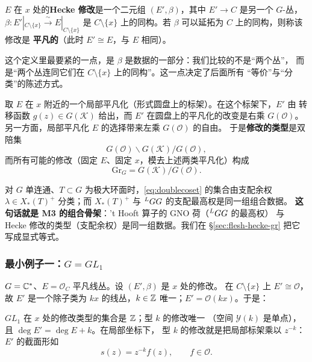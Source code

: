 \begin{definition}[Hecke 修改]\label{def:hecke}
$E$ 在 $x$ 处的\textbf{Hecke 修改}是一个二元组 $(E',\beta)$，其中 $E'\to C$ 是另一个
$G$-丛，$\beta:E'|_{C\setminus\{x\}}\xrightarrow{\ \sim\ }E|_{C\setminus\{x\}}$ 是
$C\setminus\{x\}$ 上的同构。若 $\beta$ 可以延拓为 $C$ 上的同构，则称该修改是
\textbf{平凡的}（此时 $E'\cong E$，与 $E$ 相同）。
\end{definition}

这个定义里最要紧的一点，是 $\beta$ 是数据的一部分：我们比较的不是“两个丛”，
而是“两个丛连同它们在 $C\setminus\{x\}$ 上的同构”。这一点决定了后面所有
“等价”与“分类”的陈述方式。

\begin{definition}[修改的类型]\label{def:type}
取 $E$ 在 $x$ 附近的一个局部平凡化（形式圆盘上的标架）。在这个标架下，$E'$ 由
转移函数 $g(z)\in G(\mathcal{K})$ 给出，而 $E'$ 在圆盘上的平凡化的改变是右乘
$G(\mathcal{O})$。另一方面，局部平凡化 $E$ 的选择带来左乘 $G(\mathcal{O})$ 的自由。
于是\textbf{修改的类型}是双陪集
\begin{equation}
G(\mathcal{O})\backslash G(\mathcal{K})/G(\mathcal{O}),
\label{eq:doublecoset}
\end{equation}
而所有可能的修改（固定 $E$、固定 $x$，模去上述两类平凡化）构成
\begin{equation}
\mathrm{Gr}_G=G(\mathcal{K})/G(\mathcal{O}).
\label{eq:grdef}
\end{equation}
\end{definition}

对 $G$ 单连通、$T\subset G$ 为极大环面时，\eqref{eq:doublecoset} 的集合由支配余权
$\lambda\in X_*(T)^+$ 分类；而 $X_*(T)^+$ 与 ${}^{L}G G$ 的支配最高权是同一组组合数据。
\textbf{这句话就是 \textbf{M3} 的组合骨架}：'t Hooft{} 算子的 GNO 荷（${}^{L}G G$ 的最高权）
与 Hecke 修改的类型（支配余权）是同一组数据。我们在
§\ref{sec:flesh-hecke-gr} 把它写成显式等式。\pA{}

\subsubsection{最小例子一：$G=GL_1$}

$G=\mathbb{C}^*$、$E=\mathcal{O}_C$ 平凡线丛。设 $(E',\beta)$ 是 $x$ 处的修改。
在 $C\setminus\{x\}$ 上 $E'\cong\mathcal{O}$，故 $E'$ 是一个除子类为 $k x$
的线丛，$k\in\mathbb{Z}$ 唯一；$E'=\mathcal{O}(kx)$。于是：

\begin{proposition}[$GL_1$ 的修改]\label{prop:gl1}
$GL_1$ 在 $x$ 处的修改类型的集合是 $\mathbb{Z}$；型 $k$ 的修改唯一
（空间 $\mathcal{Y}(k)$ 是单点），且 $\deg E'=\deg E+k$。在局部坐标下，
型 $k$ 的修改就是把局部标架乘以 $z^{-k}$：
$E'$ 的截面形如
\begin{equation}
s(z)=z^{-k}f(z),\qquad f\in\mathcal{O}.
\label{eq:gl1section}
\end{equation}
\end{proposition}

